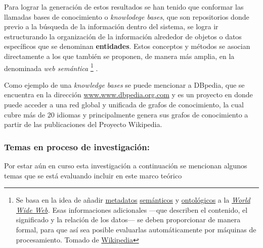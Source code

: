 \documentclass[
  10,
  spanish,
  openany]{book}
\begin{document}
Para lograr la generación de estos resultados se han tenido que conformar las llamadas bases de conocimiento o \emph{knowlodege bases}, que son repositorios donde previo a la búsqueda de la información dentro del sistema, se logra ir estructurando la organización de la información alrededor de objetos o datos específicos que se denominan \textbf{entidades}. Estos conceptos y métodos se asocian directamente a los que también se proponen, de manera más amplia, en la denominada \emph{web semántica} \footnote{Se basa en la idea de añadir \href{https://es.wikipedia.org/wiki/Metadato}{metadatos} \href{https://es.wikipedia.org/wiki/Sem\%C3\%A1ntica}{semánticos} y \href{https://es.wikipedia.org/wiki/Ontolog\%C3\%ADa_(Inform\%C3\%A1tica)}{ontológicos} a la \href{https://es.wikipedia.org/wiki/World_Wide_Web}{\emph{World Wide Web}}\emph{.} Esas informaciones adicionales ---que describen el contenido, el significado y la relación de los datos--- se deben proporcionar de manera formal, para que así sea posible evaluarlas automáticamente por máquinas de procesamiento. Tomado de \href{https://es.wikipedia.org/wiki/Web_sem\%C3\%A1ntica}{Wikipedia}} .

Como ejemplo de una \emph{knowledge bases} se puede mencionar a DBpedia, que se encuentra en la dirección \href{www.dbpedia.com}{www.www.dbpedia.org.com} y es un proyecto en donde puede acceder a una red global y unificada de grafos de conocimiento, la cual cubre más de 20 idiomas y principalmente genera sus grafos de conocimiento a partir de las publicaciones del Proyecto Wikipedia.

\hypertarget{temas-en-proceso-de-investigaciuxf3n}{%
\subsubsection{Temas en proceso de investigación:}\label{temas-en-proceso-de-investigaciuxf3n}}

Por estar aún en curso esta investigación a continuación se mencionan algunos temas que se está evaluando incluir en este marco teórico
\end{document}
